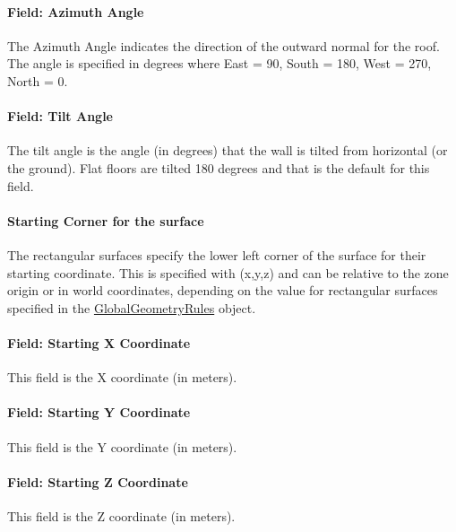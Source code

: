 \paragraph{Field: Azimuth Angle}\label{field-azimuth-angle-9}

The Azimuth Angle indicates the direction of the outward normal for the roof. The angle is specified in degrees where East = 90, South = 180, West = 270, North = 0.

\paragraph{Field: Tilt Angle}\label{field-tilt-angle-9}

The tilt angle is the angle (in degrees) that the wall is tilted from horizontal (or the ground). Flat floors are tilted 180 degrees and that is the default for this field.

\paragraph{Starting Corner for the surface}\label{starting-corner-for-the-surface-9}

The rectangular surfaces specify the lower left corner of the surface for their starting coordinate. This is specified with (x,y,z) and can be relative to the zone origin or in world coordinates, depending on the value for rectangular surfaces specified in the \hyperref[globalgeometryrules]{GlobalGeometryRules} object.

\paragraph{Field: Starting X Coordinate}\label{field-starting-x-coordinate-9}

This field is the X coordinate (in meters).

\paragraph{Field: Starting Y Coordinate}\label{field-starting-y-coordinate-9}

This field is the Y coordinate (in meters).

\paragraph{Field: Starting Z Coordinate}\label{field-starting-z-coordinate-9}

This field is the Z coordinate (in meters).

